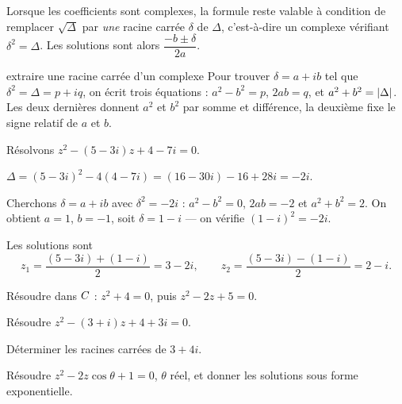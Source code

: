 \begin{propriete}
Lorsque les coefficients sont complexes, la formule reste valable à condition
de remplacer $\sqrt\Delta$ par \emph{une} racine carrée $\delta$ de $\Delta$,
c'est-à-dire un complexe vérifiant $\delta^{2} = \Delta$. Les solutions sont
alors $\dfrac{-b\pm\delta}{2a}$.
\end{propriete}

\begin{methode}{extraire une racine carrée d'un complexe}
Pour trouver $\delta = a+ib$ tel que $\delta^{2} = \Delta = p+iq$, on écrit
trois équations : $a^{2}-b^{2} = p$, $2ab = q$, et
$a^{2}+b^{2} = \left|\Delta\right|$. Les deux dernières donnent $a^{2}$ et $b^{2}$ par
somme et différence, la deuxième fixe le signe relatif de $a$ et $b$.
\end{methode}

\begin{exemple}
Résolvons $z^{2}-(5-3i)z+4-7i = 0$.

$\Delta = (5-3i)^{2}-4(4-7i) = (16-30i)-16+28i = -2i$.

Cherchons $\delta = a+ib$ avec $\delta^{2} = -2i$ : $a^{2}-b^{2} = 0$,
$2ab = -2$ et $a^{2}+b^{2} = 2$. On obtient $a = 1$, $b = -1$, soit
$\delta = 1-i$ — on vérifie $(1-i)^{2} = -2i$.

Les solutions sont
\[
  z_{1} = \frac{(5-3i)+(1-i)}{2} = 3-2i,
  \qquad
  z_{2} = \frac{(5-3i)-(1-i)}{2} = 2-i .
\]
\end{exemple}

\begin{entrainement}[équations]
\exo[\niveau{1}] Résoudre dans $C$ : $z^{2}+4 = 0$, puis $z^{2}-2z+5 = 0$.

\exo[\niveau{2}] Résoudre $z^{2}-(3+i)z+4+3i = 0$.

\exo[\niveau{2}] Déterminer les racines carrées de $3+4i$.

\exo[\niveau{3}] Résoudre $z^{2}-2z\cos\theta+1 = 0$, $\theta$ réel, et donner
les solutions sous forme exponentielle.
\end{entrainement}

